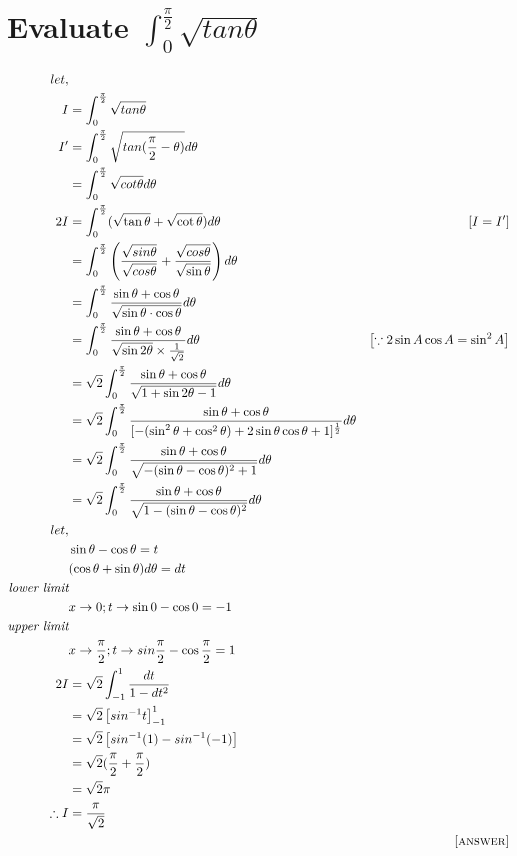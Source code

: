 \documentclass[12pt]{article}
\begin{document}
\section{Evaluate $\int_{0}^{\frac{\pi}{2}}\sqrt{tan \theta}$}
\begin{align*}
    let,\\
    I &= \int_{0}^{\frac{\pi}{2}}\sqrt{tan \theta}\\
    I{'}&= \int_{0}^{\frac{\pi}{2}}\sqrt{tan(\frac{\pi}{2}-\theta)} d\theta\\
    &= \int_{0}^{\frac{\pi}{2}}\sqrt{cot\theta} d\theta\\
    2I &= \int_{0}^{\frac{\pi}{2}}(\sqrt{\tan\theta} + \sqrt{\cot\theta})d\theta\ &[I=I{'}]\\
        &= \int_{0}^{\frac{\pi}{2}} \left(\frac{\sqrt{sin\theta}}{\sqrt{cos\theta}} + \frac{\sqrt{cos\theta}}{\sqrt{\sin\theta}}\right)d\theta\\
        &= \int_{0}^{\frac{\pi}{2}} \frac{\sin\theta+\cos\theta}{\sqrt{\sin\theta \cdot \cos\theta}}d\theta\\
        &= \int_{0}^{\frac{\pi}{2}}\frac{\sin\theta+\cos\theta}{\sqrt{\sin2\theta}\times \frac{1}{\sqrt{2}}} d\theta  & \left[\because 2\sin A \cos A= \sin^2A \right]\\
        &= \sqrt{2}\int_{0}^{\frac{\pi}{2}} \frac{\sin\theta + \cos\theta}{\sqrt{1+\sin2\theta-1}}d\theta\\
        &= \sqrt{2}\int_{0}^{\frac{\pi}{2}} \frac{\sin\theta+\cos\theta}{[-(\sin^2\theta+\cos^2\theta)+2\sin\theta\cos\theta + 1]^{\frac{1}{2}}}d\theta\\
        &= \sqrt{2}\int_{0}^{\frac{\pi}{2}} \frac{\sin\theta+\cos\theta}{\sqrt{-(\sin\theta-\cos\theta)^2+1}}d\theta\\
        &= \sqrt{2}\int_{0}^{\frac{\pi}{2}} \frac{\sin\theta+\cos\theta}{\sqrt{1-(\sin\theta-\cos\theta)^2}}d\theta\\
        let, &\\
        &\sin\theta-\cos\theta=t\\
        &(\cos\theta +\sin\theta)d\theta=dt\\
        \textit{lower limit}\\
        &x\rightarrow 0 ;t\rightarrow \sin0-\cos0 =-1\\
        \textit{upper limit}\\
        &x\rightarrow\frac{\pi}{2}; t\rightarrow sin\frac{\pi}{2} - \cos\frac{\pi}{2} = 1\\
        2I&=\sqrt{2} \int_{-1}^{1} \frac{dt}{1-dt^2}\\
          &=\sqrt{2} \left[sin^{-1} t\right]_{-1}^{1}\\ 
          &= \sqrt{2} \left[sin^{-1}(1)- sin^{-1}(-1)\right]\\
          &=\sqrt{2}(\frac{\pi}{2}+\frac{\pi}{2})\\
          &=\sqrt{2} \pi\\
          \therefore I &= \frac{\pi}{\sqrt{2}}\\
          & &\textsc{[answer]}
\end{align*}
\end{document}
